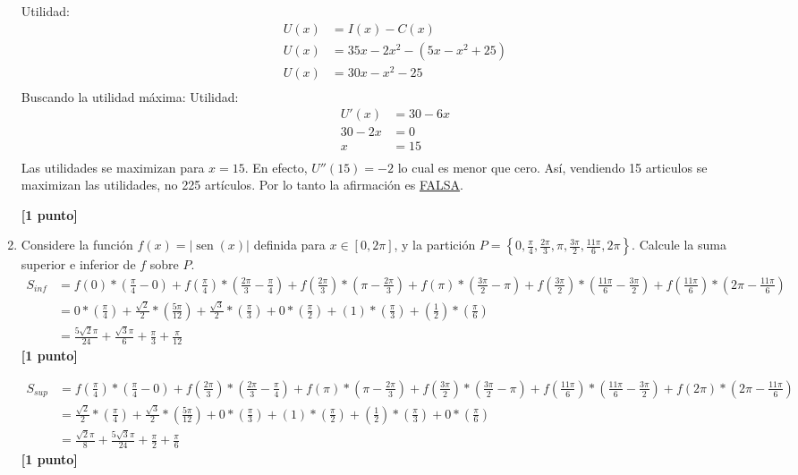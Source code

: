 \documentclass[a4paper,10pt]{article}
\newcommand{\dis}{\displaystyle}
\def\sin{\operatorname{sen}}
\begin{document}
\begin{enumerate}
Utilidad:
\begin{align*}
 \dis  U(x)  &=  \dis  I(x)-C(x)\\
 \dis  U(x)  &=  \dis  35x - 2x^2-(5x - x^2 + 25)\\
 \dis  U(x)  &=  \dis  30x - x^2 - 25\\
\end{align*}
Buscando la utilidad máxima:
Utilidad:
\begin{align*}
 \dis  U'(x)  &=  30 - 6x\\
  \dis  30 - 2x  &= 0 \\
  \dis  x  &= 15 \\
\end{align*}
Las utilidades se maximizan para $x= 15$. En efecto, $U''(15)=-2$ lo cual es menor que cero.
Así, vendiendo 15 articulos se maximizan las utilidades, no 225 artículos. Por lo tanto la afirmación es \underline{FALSA}.

\dotfill\textbf{[1 punto]}

\newpage

\item Considere la función $f(x) = |\sin(x)|$ definida para $x \in [0,2\pi]$, y la partición $\displaystyle P = \left\{ 0, \frac{\pi}{4} , \frac{2\pi}{3} , \pi , \frac{3\pi}{2} , \frac{11\pi}{6} , 2\pi \right\}$. Calcule la suma superior e inferior de $f$ sobre $P$. \\

\begin{align*}
 \dis  S_{inf}  &=  f(0)*(\frac{\pi}{4}-0) + f(\frac{\pi}{4})*(\frac{2\pi}{3}-\frac{\pi}{4}) + f(\frac{2\pi}{3})*(\pi-\frac{2\pi}{3}) + f(\pi)*(\frac{3\pi}{2}-\pi) + f(\frac{3\pi}{2})*(\frac{11\pi}{6}-\frac{3\pi}{2}) + f(\frac{11\pi}{6})*(2\pi-\frac{11\pi}{6})\\
  &=  0*(\frac{\pi}{4}) + \frac{\sqrt{2}}{2}*(\frac{5\pi}{12}) + \frac{\sqrt{3}}{2}*(\frac{\pi}{3}) + 0*(\frac{\pi}{2}) + (1)*(\frac{\pi}{3}) + (\frac{1}{2})*(\frac{\pi}{6})\\
  &=   \frac{5\sqrt{2}\pi}{24} + \frac{\sqrt{3}\pi}{6} + \frac{\pi}{3} + \frac{\pi}{12}
\end{align*}
\dotfill\textbf{[1 punto]}

\begin{align*}
 \dis  S_{sup}  &=  f(\frac{\pi}{4})*(\frac{\pi}{4}-0) + f(\frac{2\pi}{3})*(\frac{2\pi}{3}-\frac{\pi}{4}) + f(\pi)*(\pi-\frac{2\pi}{3}) + f(\frac{3\pi}{2})*(\frac{3\pi}{2}-\pi) + f(\frac{11\pi}{6})*(\frac{11\pi}{6}-\frac{3\pi}{2}) + f(2\pi)*(2\pi-\frac{11\pi}{6})\\
  &=  \frac{\sqrt{2}}{2}*(\frac{\pi}{4}) + \frac{\sqrt{3}}{2}*(\frac{5\pi}{12}) + 0*(\frac{\pi}{3}) + (1)*(\frac{\pi}{2}) + (\frac{1}{2})*(\frac{\pi}{3}) + 0*(\frac{\pi}{6})\\
  &=   \frac{\sqrt{2}\pi}{8} + \frac{5\sqrt{3}\pi}{24} + \frac{\pi}{2} + \frac{\pi}{6}
\end{align*}
\dotfill\textbf{[1 punto]}


\end{enumerate}
\end{document}
